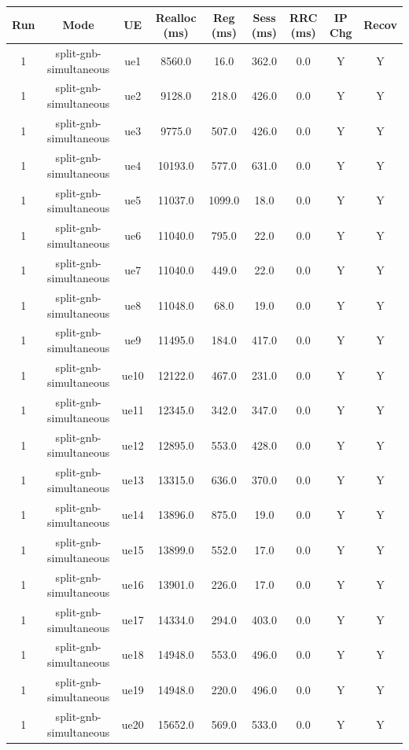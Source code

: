 \begin{table}[ht]
\centering
\begin{tabular}{|c|c|c|c|c|c|c|c|c|}
\hline
Run & Mode & UE & Realloc (ms) & Reg (ms) & Sess (ms) & RRC (ms) & IP Chg & Recov \\
\hline
1 & split-gnb-simultaneous & ue1 & 8560.0 & 16.0 & 362.0 & 0.0 & Y & Y \\
1 & split-gnb-simultaneous & ue2 & 9128.0 & 218.0 & 426.0 & 0.0 & Y & Y \\
1 & split-gnb-simultaneous & ue3 & 9775.0 & 507.0 & 426.0 & 0.0 & Y & Y \\
1 & split-gnb-simultaneous & ue4 & 10193.0 & 577.0 & 631.0 & 0.0 & Y & Y \\
1 & split-gnb-simultaneous & ue5 & 11037.0 & 1099.0 & 18.0 & 0.0 & Y & Y \\
1 & split-gnb-simultaneous & ue6 & 11040.0 & 795.0 & 22.0 & 0.0 & Y & Y \\
1 & split-gnb-simultaneous & ue7 & 11040.0 & 449.0 & 22.0 & 0.0 & Y & Y \\
1 & split-gnb-simultaneous & ue8 & 11048.0 & 68.0 & 19.0 & 0.0 & Y & Y \\
1 & split-gnb-simultaneous & ue9 & 11495.0 & 184.0 & 417.0 & 0.0 & Y & Y \\
1 & split-gnb-simultaneous & ue10 & 12122.0 & 467.0 & 231.0 & 0.0 & Y & Y \\
1 & split-gnb-simultaneous & ue11 & 12345.0 & 342.0 & 347.0 & 0.0 & Y & Y \\
1 & split-gnb-simultaneous & ue12 & 12895.0 & 553.0 & 428.0 & 0.0 & Y & Y \\
1 & split-gnb-simultaneous & ue13 & 13315.0 & 636.0 & 370.0 & 0.0 & Y & Y \\
1 & split-gnb-simultaneous & ue14 & 13896.0 & 875.0 & 19.0 & 0.0 & Y & Y \\
1 & split-gnb-simultaneous & ue15 & 13899.0 & 552.0 & 17.0 & 0.0 & Y & Y \\
1 & split-gnb-simultaneous & ue16 & 13901.0 & 226.0 & 17.0 & 0.0 & Y & Y \\
1 & split-gnb-simultaneous & ue17 & 14334.0 & 294.0 & 403.0 & 0.0 & Y & Y \\
1 & split-gnb-simultaneous & ue18 & 14948.0 & 553.0 & 496.0 & 0.0 & Y & Y \\
1 & split-gnb-simultaneous & ue19 & 14948.0 & 220.0 & 496.0 & 0.0 & Y & Y \\
1 & split-gnb-simultaneous & ue20 & 15652.0 & 569.0 & 533.0 & 0.0 & Y & Y \\

\end{tabular}
\end{table}
